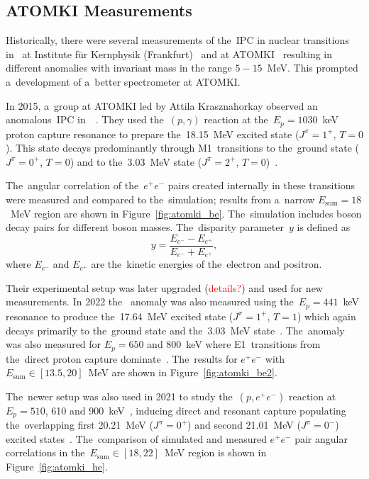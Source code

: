 		\subsection{ATOMKI Measurements}
			Historically, there were several measurements of the~\ac{IPC} in nuclear transitions in~ at Institute für Kernphysik (Frankfurt)~\cite{ikf1996,ikf1997,ikf2001} and at ATOMKI~\cite{atomki2008,atomki2012} resulting in different anomalies with invariant mass in the range $5-15$~MeV. This prompted a~development of a~better spectrometer at ATOMKI.
		
			In 2015, a~group at ATOMKI led by Attila Krasznahorkay observed an anomalous~\ac{IPC} in~~\cite{atomki_be}. They used the~$(p,\gamma)$ reaction at the~$E_p = 1030$~keV proton capture resonance to prepare the~18.15~MeV excited state ($J^\pi = 1^{+}$, $T=0$). This state decays predominantly through M1~transitions to the~ground state ($J^\pi = 0^{+}$, $T=0$) and to the~3.03~MeV state ($J^\pi = 2^{+}$, $T=0$)~\cite{resonances}.
			
			The~angular correlation of the~$e^+ e^-$ pairs created internally in these transitions were measured and compared to the~simulation; results from a~narrow $E_\text{sum}=18$~MeV region are shown in Figure~\ref{fig:atomki_be}. The~simulation includes boson decay pairs for different boson masses. The~disparity parameter~$y$ is defined as
				\begin{equation}
					y = \frac{E_{e^-}-E_{e^+}}{E_{e^-}+E_{e^+}},
					\label{eq:dispar}
				\end{equation}
			where $E_{e^-}$ and $E_{e^+}$ are the~kinetic energies of the~electron and positron.
			
			Their experimental setup was later upgraded (\textcolor{red}{details?}) and used for new measurements. In 2022 the~ anomaly was also measured using the~$E_p = 441$~keV resonance to produce the~17.64~MeV excited state ($J^\pi = 1^{+}$, $T=1$) which again decays primarily to the~ground state and the~3.03~MeV state~\cite{resonances}. The~anomaly was also measured for $E_p = 650$ and 800~keV where E1~transitions from the~direct proton capture dominate~\cite{atomki_be2}. The~results for $e^+e^-$ with ${E_\text{sum}\in[13.5,20]}$~MeV are shown in Figure~\ref{fig:atomki_be2}.
			
			The~newer setup was also used in 2021 to study the~$(p,e^+ e^-)$ reaction at $E_p = 510$, 610 and 900~keV~\cite{atomki_he2}, inducing direct and resonant capture populating the~overlapping first 20.21~MeV ($J^\pi = 0^+$) and second 21.01~MeV ($J^\pi = 0^-$) excited states~\cite{resonances2}. The~comparison of simulated and measured $e^+e^-$ pair angular correlations in the~${E_\text{sum}\in[18,22]}$~MeV region is shown in Figure~\ref{fig:atomki_he}.
			
